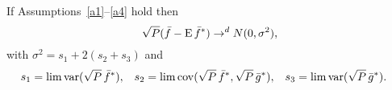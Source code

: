 If Assumptions~\ref{a1}--\ref{a4} hold then
\begin{equation*}
  \sqrt{P} (\bar{f} - \operatorname{E} \bar{f}^*) \to^d N(0, \sigma^2),
\end{equation*}
with $\sigma^2 = s_1 + 2(s_2 + s_3)$ and
\begin{align*}
    s_1  &= \lim \operatorname{var}(\sqrt{P}\, \bar{f}^*), &
    s_2  &= \lim \operatorname{cov}(\sqrt{P}\, \bar{f}^*, \sqrt{P}\, \bar{g}^*), &
    s_3  &= \lim \operatorname{var}(\sqrt{P}\, \bar{g}^*).
\end{align*}
